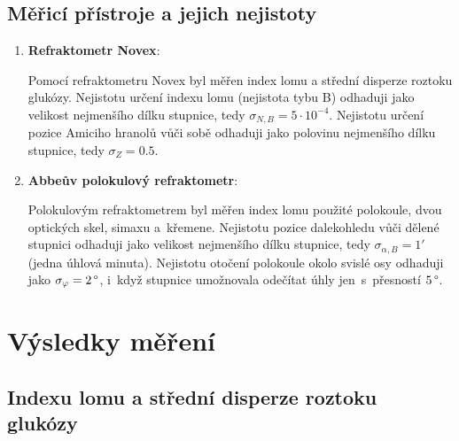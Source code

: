 \documentclass{../concepts/titul_protokol_p/prepareprotokol} %
\begin{document}
\subsection{Měřicí přístroje a jejich nejistoty}
\begin{enumerate}
    \item \textbf{Refraktometr Novex}:
    
    Pomocí refraktometru Novex byl měřen index lomu a střední disperze roztoku glukózy. Nejistotu určení indexu
    lomu (nejistota tybu B) odhaduji jako velikost nejmenšího dílku stupnice, tedy $\sigma_{N,B}= 5\cdot10^{-4}$.
    Nejistotu určení pozice Amiciho hranolů vůči sobě odhaduji jako polovinu nejmenšího dílku
    stupnice, tedy $\sigma_Z = 0.5$.

    \item \textbf{Abbeův polokulový refraktometr}:

    Polokulovým refraktometrem byl měřen index lomu použité polokoule, dvou optických skel, simaxu a~křemene.
    Nejistotu pozice dalekohledu vůči dělené stupnici odhaduji jako velikost nejmenšího dílku
    stupnice, tedy $\sigma_{\alpha,B} = 1'$ (jedna úhlová minuta). Nejistotu otočení polokoule okolo svislé
    osy odhaduji jako $\sigma_{\varphi} = 2 \,\degree$, i~když stupnice umožnovala odečítat úhly jen~s~přesností
    $5\,\degree$.

\end{enumerate}


\section{Výsledky měření}

\subsection{Indexu lomu a střední disperze roztoku glukózy}
\end{document}
